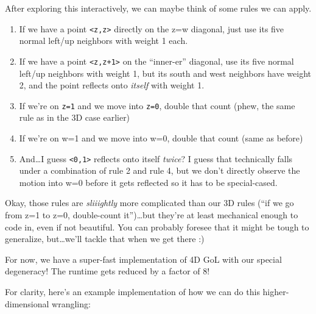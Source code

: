 \documentclass[]{article}
\begin{document}
After exploring this interactively, we can maybe think of some rules we can
apply.

\begin{enumerate}
\def\labelenumi{\arabic{enumi}.}
\tightlist
\item
  If we have a point \texttt{\textless{}z,z\textgreater{}} directly on the z=w
  diagonal, just use its five normal left/up neighbors with weight 1 each.
\item
  If we have a point \texttt{\textless{}z,z+1\textgreater{}} on the ``inner-er''
  diagonal, use its five normal left/up neighbors with weight 1, but its south
  and west neighbors have weight 2, and the point reflects onto \emph{itself}
  with weight 1.
\item
  If we're on \texttt{z=1} and we move into \texttt{z=0}, double that count
  (phew, the same rule as in the 3D case earlier)
\item
  If we're on w=1 and we move into w=0, double that count (same as before)
\item
  And\ldots I guess \texttt{\textless{}0,1\textgreater{}} reflects onto itself
  \emph{twice}? I guess that technically falls under a combination of rule 2 and
  rule 4, but we don't directly observe the motion into w=0 before it gets
  reflected so it has to be special-cased.
\end{enumerate}

Okay, those rules are \emph{sliiightly} more complicated than our 3D rules (``if
we go from z=1 to z=0, double-count it'')\ldots but they're at least mechanical
enough to code in, even if not beautiful. You can probably foresee that it might
be tough to generalize, but\ldots we'll tackle that when we get there :)

For now, we have a super-fast implementation of 4D GoL with our special
degeneracy! The runtime gets reduced by a factor of 8!

For clarity, here's an example implementation of how we can do this
higher-dimensional wrangling:
\end{document}
